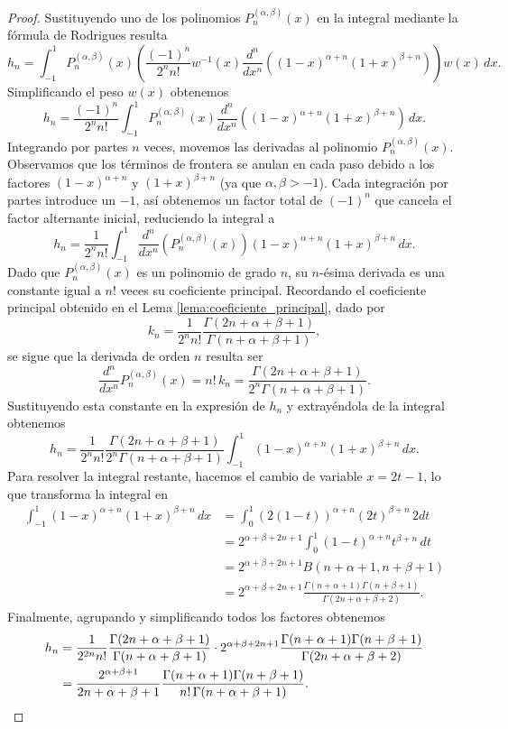 \documentclass[12pt,a4paper]{book}
\begin{document}
\begin{proof}
Sustituyendo uno de los polinomios $P_n^{(\alpha, \beta)}(x)$ en la integral mediante la fórmula de Rodrigues resulta
\[
h_n = \int_{-1}^{1} P_n^{(\alpha, \beta)}(x) \left( \frac{(-1)^n}{2^n n!}w^{-1}(x) \frac{d^n}{dx^n} ((1-x)^{\alpha+n}(1+x)^{\beta+n}) \right) w(x) \, dx.
\]
Simplificando el peso $w(x)$ obtenemos
\[
h_n = \frac{(-1)^n}{2^n n!} \int_{-1}^{1} P_n^{(\alpha, \beta)}(x) \frac{d^n}{dx^n} ((1-x)^{\alpha+n}(1+x)^{\beta+n}) \, dx.
\]
Integrando por partes $n$ veces, movemos las derivadas al polinomio $P_n^{(\alpha, \beta)}(x)$. Observamos que los términos de frontera se anulan en cada paso debido a los factores $(1-x)^{\alpha+n}$ y $(1+x)^{\beta+n}$ (ya que $\alpha, \beta > -1$). Cada integración por partes introduce un $-1$, así obtenemos un factor total de $(-1)^n$ que cancela el factor alternante inicial, reduciendo la integral a
\[
h_n = \frac{1}{2^n n!} \int_{-1}^{1} \frac{d^n}{dx^n} (P_n^{(\alpha, \beta)}(x)) (1-x)^{\alpha+n}(1+x)^{\beta+n} \, dx.
\]
Dado que $P_n^{(\alpha, \beta)}(x)$ es un polinomio de grado $n$, su $n$-ésima derivada es una constante igual a $n!$ veces su coeficiente principal. Recordando el coeficiente principal obtenido en el Lema \ref{lema:coeficiente_principal}, dado por
\[
k_n = \frac{1}{2^n n!} \frac{\Gamma(2n+\alpha+\beta+1)}{\Gamma(n+\alpha+\beta+1)},
\]
se sigue que la derivada de orden $n$ resulta ser
\[
\frac{d^n}{dx^n} P_n^{(\alpha, \beta)}(x) = n! \, k_n = \frac{\Gamma(2n+\alpha+\beta+1)}{2^n \Gamma(n+\alpha+\beta+1)}.
\]
Sustituyendo esta constante en la expresión de $h_n$ y extrayéndola de la integral obtenemos
\[
h_n = \frac{1}{2^n n!} \frac{\Gamma(2n+\alpha+\beta+1)}{2^n \Gamma(n+\alpha+\beta+1)} \int_{-1}^{1} (1-x)^{\alpha+n}(1+x)^{\beta+n} \, dx.
\]
Para resolver la integral restante, hacemos el cambio de variable $x = 2t - 1$, lo que transforma la integral en
\begin{align*}
\int_{-1}^{1} (1-x)^{\alpha+n}(1+x)^{\beta+n} \, dx &= \int_{0}^{1} (2(1-t))^{\alpha+n} (2t)^{\beta+n} \, 2dt \\
&= 2^{\alpha+\beta+2n+1} \int_{0}^{1} (1-t)^{\alpha+n} t^{\beta+n} \, dt \\
&= 2^{\alpha+\beta+2n+1} B(n+\alpha+1, n+\beta+1) \\
&= 2^{\alpha+\beta+2n+1} \frac{\Gamma(n+\alpha+1)\Gamma(n+\beta+1)}{\Gamma(2n+\alpha+\beta+2)}.
\end{align*}
Finalmente, agrupando y simplificando todos los factores obtenemos
\begin{align*}
h_n &= \frac{1}{2^{2n} n!} \frac{\Gamma(2n+\alpha+\beta+1)}{\Gamma(n+\alpha+\beta+1)} \cdot 2^{\alpha+\beta+2n+1} \frac{\Gamma(n+\alpha+1)\Gamma(n+\beta+1)}{\Gamma(2n+\alpha+\beta+2)} \\
&= \frac{2^{\alpha+\beta+1}}{2n+\alpha+\beta+1} \frac{\Gamma(n+\alpha+1)\Gamma(n+\beta+1)}{n! \, \Gamma(n+\alpha+\beta+1)}. \qedhere
\end{align*}
\end{proof}
\end{document}
